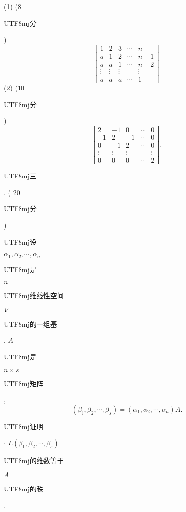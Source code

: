 \documentclass[10pt]{article}
\begin{document}
(1) (8 \begin{CJK}{UTF8}{mj}分\end{CJK})
$$
\left|\begin{array}{ccccc}
1 & 2 & 3 & \cdots & n \\
a & 1 & 2 & \cdots & n-1 \\
a & a & 1 & \cdots & n-2 \\
\vdots & \vdots & \vdots & & \vdots \\
a & a & a & \cdots & 1
\end{array}\right|
$$
(2) (10 \begin{CJK}{UTF8}{mj}分\end{CJK})
$$
\left|\begin{array}{ccccc}
2 & -1 & 0 & \cdots & 0 \\
-1 & 2 & -1 & \cdots & 0 \\
0 & -1 & 2 & \cdots & 0 \\
\vdots & \vdots & \vdots & & \vdots \\
0 & 0 & 0 & \cdots & 2
\end{array}\right| .
$$
\begin{CJK}{UTF8}{mj}三\end{CJK}. ( 20 \begin{CJK}{UTF8}{mj}分\end{CJK}) \begin{CJK}{UTF8}{mj}设\end{CJK} $\alpha_{1}, \alpha_{2}, \cdots, \alpha_{n}$ \begin{CJK}{UTF8}{mj}是\end{CJK} $n$ \begin{CJK}{UTF8}{mj}维线性空间\end{CJK} $V$ \begin{CJK}{UTF8}{mj}的一组基\end{CJK}, $A$ \begin{CJK}{UTF8}{mj}是\end{CJK} $n \times s$ \begin{CJK}{UTF8}{mj}矩阵\end{CJK},
$$
\left(\beta_{1}, \beta_{2}, \cdots, \beta_{s}\right)=\left(\alpha_{1}, \alpha_{2}, \cdots, \alpha_{n}\right) A .
$$
\begin{CJK}{UTF8}{mj}证明\end{CJK}: $L\left(\beta_{1}, \beta_{2}, \cdots, \beta_{s}\right)$ \begin{CJK}{UTF8}{mj}的维数等于\end{CJK} $A$ \begin{CJK}{UTF8}{mj}的秩\end{CJK}.
\end{document}
